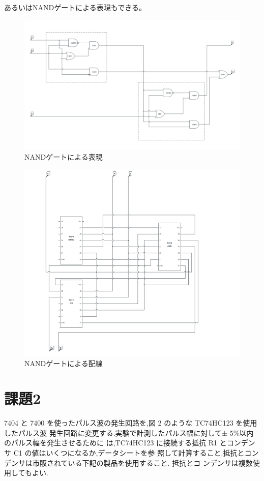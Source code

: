 \documentclass[xelatex,ja=standard,jafont=noto]{bxjsarticle}
\begin{document}
\newpage


あるいはNANDゲートによる表現もできる。


\begin{figure}[h!]
    \centering
    \includegraphics[scale=0.4]{nand.png}
    \caption{NANDゲートによる表現}
\end{figure}


\begin{figure}[h!]
    \centering
    \includegraphics[scale=0.8]{nandic.png}
    \caption{NANDゲートによる配線}
\end{figure}



\section{課題2}
7404 と 7400 を使ったパルス波の発生回路を,図 2 のような TC74HC123 を使用したパルス波
発生回路に変更する.実験で計測したパルス幅に対して± 5$  \% $以内のパルス幅を発生させるために
は,TC74HC123 に接続する抵抗 R1 とコンデンサ C1 の値はいくつになるか,データシートを参
照して計算すること.抵抗とコンデンサは市販されている下記の製品を使用すること. 抵抗とコ
ンデンサは複数使用してもよい.\\
\end{document}
